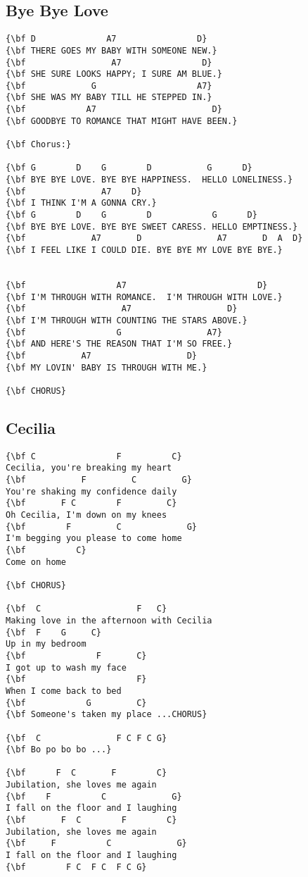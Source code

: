 \documentclass[a4paper]{article}
\begin{document}
\subsection{Bye Bye Love} %
\label{sub:Bye Bye Love}
\begin{Verbatim}[commandchars=\\\{\}]
{\bf D              A7                D}
{\bf THERE GOES MY BABY WITH SOMEONE NEW.}
{\bf                 A7                D}
{\bf SHE SURE LOOKS HAPPY; I SURE AM BLUE.}
{\bf             G                    A7}
{\bf SHE WAS MY BABY TILL HE STEPPED IN.}
{\bf            A7                       D}
{\bf GOODBYE TO ROMANCE THAT MIGHT HAVE BEEN.}

{\bf Chorus:}

{\bf G        D    G        D           G      D}
{\bf BYE BYE LOVE. BYE BYE HAPPINESS.  HELLO LONELINESS.}
{\bf               A7    D}
{\bf I THINK I'M A GONNA CRY.}
{\bf G        D    G        D            G      D}
{\bf BYE BYE LOVE. BYE BYE SWEET CARESS. HELLO EMPTINESS.}
{\bf             A7       D               A7       D  A  D}
{\bf I FEEL LIKE I COULD DIE. BYE BYE MY LOVE BYE BYE.}


{\bf                  A7                          D}
{\bf I'M THROUGH WITH ROMANCE.  I'M THROUGH WITH LOVE.}
{\bf                   A7                   D}
{\bf I'M THROUGH WITH COUNTING THE STARS ABOVE.}
{\bf                  G                 A7}
{\bf AND HERE'S THE REASON THAT I'M SO FREE.}
{\bf           A7                   D}
{\bf MY LOVIN' BABY IS THROUGH WITH ME.}

{\bf CHORUS}
\end{Verbatim}
\newpage
\subsection{Cecilia} %
\label{sub:Cecili}
\begin{Verbatim}[commandchars=\\\{\}]
{\bf C                F          C}
Cecilia, you're breaking my heart
{\bf           F         C         G}
You're shaking my confidence daily
{\bf       F C        F         C}
Oh Cecilia, I'm down on my knees
{\bf        F         C             G}
I'm begging you please to come home
{\bf          C}
Come on home

{\bf CHORUS}

{\bf  C                   F   C}
Making love in the afternoon with Cecilia
{\bf  F    G     C}
Up in my bedroom
{\bf              F       C}
I got up to wash my face
{\bf                      F}
When I come back to bed
{\bf            G         C}
{\bf Someone's taken my place ...CHORUS}

{\bf  C               F C F C G}
{\bf Bo po bo bo ...}

{\bf      F  C       F        C}
Jubilation, she loves me again
{\bf    F          C             G}
I fall on the floor and I laughing
{\bf       F  C        F        C}
Jubilation, she loves me again
{\bf     F          C             G}
I fall on the floor and I laughing
{\bf        F C  F C  F C G}
\end{Verbatim}
\newpage
\end{document}
